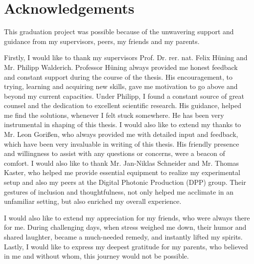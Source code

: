 \chapter*{Acknowledgements}
This graduation project was possible because of the unwavering support and guidance from my supervisors, peers, my friends and my parents.

Firstly, I would like to thank my supervisors Prof. Dr. rer. nat. Felix Hüning and Mr. Philipp Walderich. Professor Hüning always provided me honest feedback and constant support during the course of the thesis. His encouragement, to trying, learning and acquiring new skills, gave me motivation to go above and beyond my current capacities. Under Philipp, I found a constant source of great counsel and the dedication to excellent scientific research. His guidance, helped me find the solutions, whenever I felt stuck somewhere. He has been very instrumental in shaping of this thesis. I would also like to extend my thanks to Mr. Leon Gorißen, who always provided me with detailed input and feedback, which have been very invaluable in writing of this thesis. His friendly presence and willingness to assist with any questions or concerns, were a beacon of comfort. I would also like to thank Mr. Jan-Niklas Schneider and Mr. Thomas Kaster, who helped me provide essential equipment to realize my experimental setup and also my peers at the Digital Photonic Production (DPP) group. Their gestures of inclusion and thoughtfulness, not only helped me acclimate in an unfamiliar setting, but also enriched my overall experience.

I would also like to extend my appreciation for my friends, who were always there for me. During challenging days, when stress weighed me down, their humor and shared laughter, became a much-needed remedy, and instantly lifted my spirits. Lastly, I would like to express my deepest gratitude for my parents, who believed in me and without whom, this journey would not be possible.